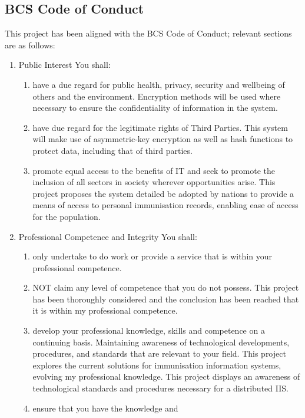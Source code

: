 \documentclass{report}
\begin{document}
\begin{flushleft}
\section{BCS Code of Conduct}
This project has been aligned with the BCS Code of Conduct;
relevant sections are as follows:
\renewcommand{\labelenumii}{\alph{enumii}}
 \begin{enumerate}
   \item Public Interest
   You shall:
   \begin{enumerate}
     \item have a due regard for public health, privacy,
     security and wellbeing of others and the environment.
     Encryption methods will be used where necessary to
     ensure the confidentiality of information in the
     system.
     \item have due regard for the legitimate rights of Third
     Parties.
     This system will make use of asymmetric-key
     encryption as well as hash functions to protect data,
     including that of third parties.
     \item promote equal access to the benefits of IT and
     seek to promote the inclusion of all sectors in society
     wherever opportunities arise.
     This project proposes the system detailed be adopted
     by nations to provide a means of access to personal
     immunisation records, enabling ease of access for the
     population.
    \end{enumerate}
   \item Professional Competence and Integrity
   You shall:
   \begin{enumerate}
    \item only undertake to do work or provide a service
    that is within your professional competence.
    \item NOT claim any level of competence that you do
    not possess. This project has been thoroughly considered and the
    conclusion has been reached that it is within my
    professional competence.
    \item develop your professional knowledge, skills and
    competence on a continuing basis. Maintaining
    awareness of technological developments,
    procedures, and standards that are relevant to your
    field.
    This project explores the current solutions for
    immunisation information systems, evolving my
    professional knowledge. This project displays an
    awareness of technological standards and procedures necessary for a distributed IIS.
    \item ensure that you have the knowledge and

\end{enumerate}
\end{enumerate}
\end{flushleft}
\end{document}
